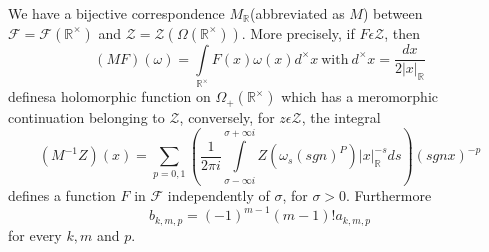 \setcounter{theorem}{1}
\begin{theorem}\label{chap1:sec4:subsec2:thm2} %
 We have a bijective correspondence $M_{\mathbb{R}}$(abbreviated
as $M$) between $\mathscr{F}=\mathscr{F}(\mathbb{R}^\times)$ and
$\mathscr{Z}=\mathscr{Z}(\Omega(\mathbb{R}^\times))$. More precisely, if
$F\epsilon \mathscr{Z}$, then 
\begin{equation*}
(MF)(\omega)=\int\limits_{\mathbb{R}^\times}F(x)\omega(x)d^\times x
~\text{with}~ d^\times x=\frac{dx}{2|x|_{\mathbb{R}}}
\end{equation*}
defines\pageoriginale a holomorphic function on $\Omega_{+}(\mathbb{R}^\times)$ which
has a meromorphic continuation belonging to $\mathscr{Z}$, conversely,
for $z\epsilon \mathscr{Z}$, the integral
\begin{equation*}
(M^{-1}Z)(x)=\sum\limits_{p=0,1}(\frac{1}{2\pi
    i}\int\limits_{\sigma-\infty i}^{\sigma+\infty i}
  Z(\omega_s(sgn)^P)|x|_{\mathbb{R}}^{-s} ds)(sgn x)^{-p}
\end{equation*}
defines a function $F$ in $\mathscr{F}$ independently of $\sigma$, for
$\sigma > 0$. Furthermore
\begin{equation*}
b_{k,m,p}=(-1)^{m-1}(m-1)!a_{k,m,p}
\end{equation*}
for every $k,m$ and $p$.
\end{theorem}

